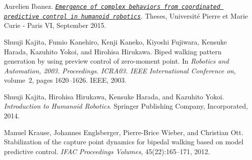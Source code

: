 
\begin{DoxyDescription}
\item[\label{_CITEREF_ibanezThesis2015}%
\mbox{[}1\mbox{]}]Aurelien Ibanez. \href{http://hal.upmc.fr/tel-01308723}{\tt {\itshape Emergence of complex behaviors from coordinated predictive control in humanoid robotics}}. Theses, Universit\'{e} Pierre et Marie Curie -\/ Paris VI, September 2015. 


\item[\label{_CITEREF_kajita2003biped}%
\mbox{[}2\mbox{]}]Shuuji Kajita, Fumio Kanehiro, Kenji Kaneko, Kiyoshi Fujiwara, Kensuke Harada, Kazuhito Yokoi, and Hirohisa Hirukawa. Biped walking pattern generation by using preview control of zero-\/moment point. In {\itshape Robotics and Automation, 2003. Proceedings. I\+C\+RA\textquotesingle{}03. I\+E\+EE International Conference on}, volume~2, pages 1620--1626. I\+E\+EE, 2003.


\item[\label{_CITEREF_Kajita2014Intro}%
\mbox{[}3\mbox{]}]Shuuji Kajita, Hirohisa Hirukawa, Kensuke Harada, and Kazuhito Yokoi. {\itshape Introduction to Humanoid Robotics}. Springer Publishing Company, Incorporated, 2014.


\item[\label{_CITEREF_krause2012stabilization}%
\mbox{[}4\mbox{]}]Manuel Krause, Johannes Englsberger, Pierre-\/\+Brice Wieber, and Christian Ott. Stabilization of the capture point dynamics for bipedal walking based on model predictive control. {\itshape I\+F\+AC Proceedings Volumes}, 45(22)\+:165--171, 2012.


\end{DoxyDescription}
